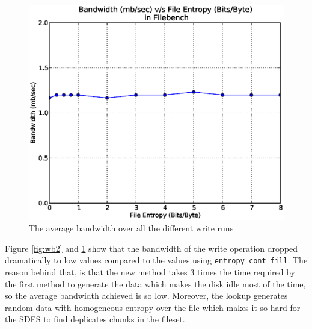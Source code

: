 \begin{figure}[H]
\begin{center}
\includegraphics[scale=.55]{../results/set2/write_bw_avg_2.eps}
\caption{The average bandwidth over all the different write runs}
\label{fig:wbavg2}
\end{center}
\end{figure}

Figure \ref{fig:wb2} and \ref{fig:wbavg2} show that the bandwidth of the write operation dropped dramatically to low values compared to the values using \verb+entropy_cont_fill+. The reason behind that, is that the new method takes 3 times the time required by the first method to generate the data which makes the disk idle most of the time, so the average bandwidth achieved is so low. Moreover, the lookup generates random data with homogeneous entropy over the file which makes it so hard for the SDFS to find deplicates chunks in the fileset.

